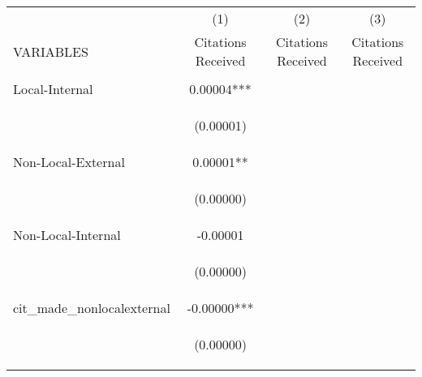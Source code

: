 \begin{center}
\begin{tabular}{lccc} \hline
 & (1) & (2) & (3) \\
VARIABLES & Citations Received & Citations Received & Citations Received \\ \hline
\vspace{4pt} & \begin{footnotesize}\end{footnotesize} & \begin{footnotesize}\end{footnotesize} & \begin{footnotesize}\end{footnotesize} \\
Local-Internal & 0.00004*** &  &  \\
\vspace{4pt} & \begin{footnotesize}(0.00001)\end{footnotesize} & \begin{footnotesize}\end{footnotesize} & \begin{footnotesize}\end{footnotesize} \\
Non-Local-External & 0.00001** &  &  \\
\vspace{4pt} & \begin{footnotesize}(0.00000)\end{footnotesize} & \begin{footnotesize}\end{footnotesize} & \begin{footnotesize}\end{footnotesize} \\
Non-Local-Internal & -0.00001 &  &  \\
\vspace{4pt} & \begin{footnotesize}(0.00000)\end{footnotesize} & \begin{footnotesize}\end{footnotesize} & \begin{footnotesize}\end{footnotesize} \\
cit\_made\_nonlocalexternal & -0.00000*** &  &  \\
\vspace{4pt} & \begin{footnotesize}(0.00000)\end{footnotesize} & \begin{footnotesize}\end{footnotesize} & \begin{footnotesize}\end{footnotesize} \\

\end{tabular}
\end{center}
